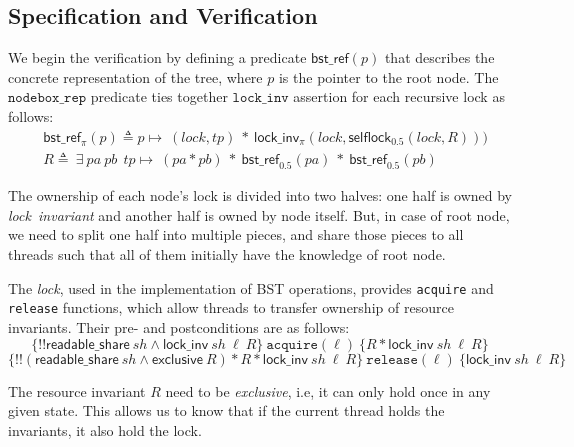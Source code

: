 \documentclass[acmsmall,screen]{acmart}\settopmatter{printfolios=true}
\newcommand{\nodeboxrep}{\ensuremath{\mathsf{bst\_ref}}}
\begin{document}
{\subsection{Specification and Verification}
We begin the verification by defining a predicate $\nodeboxrep(p)$ that describes the concrete representation of the tree, where $p$ is the pointer to the root node. The $\texttt{nodebox\_rep}$ predicate ties together $\texttt{lock\_inv}$ assertion for each recursive lock as follows: 
\begin{align*}
 &\nodeboxrep_{\pi}(p) \triangleq  p\mapsto\ (lock,tp)\ *\ \mathsf{lock\_inv_{\pi}}(lock, \mathsf{selflock}_{0.5}(lock,R))) \\&R  \triangleq\ \exists\ pa\ pb\ \ tp\mapsto\ (pa * pb)\ *\  \nodeboxrep_{0.5}(pa)\ *\ \nodeboxrep_{0.5}(pb)  \end{align*}
 
 The ownership of each node's lock is divided into two halves: one half is owned by \emph{lock\ invariant} and another half is owned by node itself. But, in case of root node, we need to split one half into multiple pieces, and share those pieces to all threads such that all of them initially have the knowledge of root node.
 
 The \emph{lock}, used in the implementation of BST operations, provides \texttt{acquire} and \texttt{release} functions, which allow threads to transfer ownership of resource invariants. Their pre- and postconditions are as follows:
$$\{!!\mathsf{readable\_share}\ \mathit{sh} \land \mathsf{lock\_inv}\ \mathit{sh}\ \ell\ R\}\ \texttt{acquire}(\ell)\ \{R * \mathsf{lock\_inv}\ \mathit{sh}\ \ell\ R\}$$
$$\{!!(\mathsf{readable\_share}\ \mathit{sh} \land \mathsf{exclusive}\ R) * R * \mathsf{lock\_inv}\ \mathit{sh}\ \ell\ R\}\ \texttt{release}(\ell)\ \{\mathsf{lock\_inv}\ \mathit{sh}\ \ell\ R\}$$


The resource invariant $R$ need to be \emph{exclusive}, i.e, it can only hold once in any given state. This allows us to know that if the current thread holds the invariants, it also hold the lock. 
}
    
\end{document}
